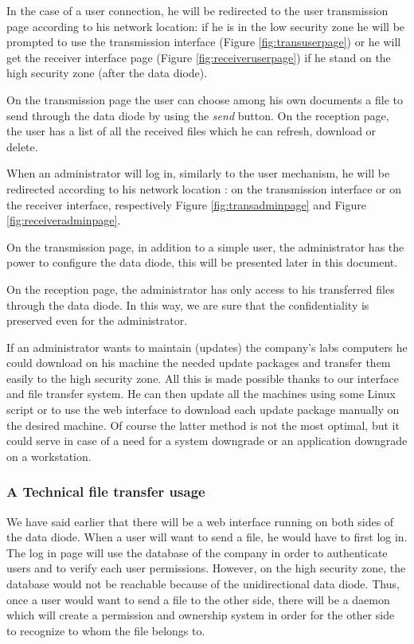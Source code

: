 \documentclass[a4paper,10pt]{article}
\begin{document}
In the case of a user connection, he will be redirected to the user transmission page according to his network location: if he is in the low security zone he will be prompted to use the transmission interface (Figure \ref{fig:transuserpage}) or he will get the receiver interface page (Figure \ref{fig:receiveruserpage}) if he stand on the high security zone (after the data diode). 

On the transmission page the user can choose among his own documents a file to send through the data diode by using the \textit{send} button. On the reception page, the user has a list of all the received files which he can refresh, download or delete.\bigskip 

When an administrator will log in, similarly to the user mechanism, he will be redirected according to his network location : on the transmission interface or on the receiver interface, respectively Figure \ref{fig:transadminpage} and Figure \ref{fig:receiveradminpage}.

On the transmission page, in addition to a simple user, the administrator has the power to configure the data diode, this will be presented later in this document.

On the reception page, the administrator has only access to his transferred files through the data diode. In this way, we are sure that the confidentiality is preserved even for the administrator.  

If an administrator wants to maintain (updates) the company's labs computers he could download on his machine the needed update packages and transfer them easily to the high security zone. All this is made possible thanks to our interface and file transfer system. He can then update all the machines using some Linux script or to use the web interface to download each update package manually on the desired machine. Of course the latter method is not the most optimal, but it could serve in case of a need for a system downgrade or an application downgrade on a workstation. 


\subsubsection{A Technical file transfer usage}
We have said earlier that there will be a web interface running on both sides of the data diode. When a user will want to send a file, he would have to first log in. The log in page will use the database of the company in order to authenticate users and to verify each user permissions. However, on the high security zone, the database would not be reachable because of the unidirectional data diode. Thus, once a user would want to send a file to the other side, there will be a daemon which will create a permission and ownership system in order for the other side to recognize to whom the file belongs to. 
\end{document}
